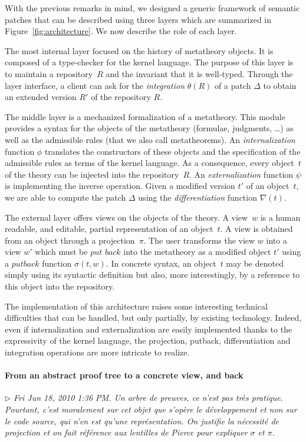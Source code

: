 \documentclass{article}
\newcommand{\remtext}[1]{\textcolor{bwgreen}{$\triangleright$ \textsl{#1}}}
\begin{document}
With the previous remarks in mind, we designed a generic framework of semantic
patches that can be described using three layers which are summarized in 
Figure~\ref{fig:architecture}. We now describe the role of each layer.

The most internal layer focused on the history of metatheory
objects. It is composed of a type-checker for the kernel language. The
purpose of this layer is to maintain a repository~$R$ and the
invariant that it is well-typed. Through the layer interface, a client
can ask for the \textit{integration} $\theta(R)$ of a patch $\Delta$
to obtain an extended version $R'$ of the repository $R$.

The middle layer is a mechanized formalization of a metatheory. This
module provides a syntax for the objects of the metatheory (formulae,
judgments, \ldots) as well as the admissible rules (that we also call
metatheorems).  An \textit{internalization} function $\phi$ translates
the constructors of these objects and the specification of the
admissible rules as terms of the kernel language. As a consequence,
every object~$t$ of the theory can be injected into the
repository~$R$. An \textit{externalization} function $\psi$ is
implementing the inverse operation. Given a modified version $t'$ of
an object~$t$, we are able to compute the patch $\Delta$ using
the \textit{differentiation} function $\nabla(t)$. 

The external layer offers views on the objects of the theory. A
view~$w$ is a human readable, and editable, partial representation of
an object~$t$. A view is obtained from an object through a
projection~$\pi$.  The user transforms the view $w$ into a view $w'$
which must be $\textit{put back}$ into the metatheory as a modified
object $t'$ using a $\textit{putback}$ function $\sigma(t, w)$.  In
concrete syntax, an object~$t$ may be denoted simply using its
syntactic definition but also, more interestingly, by a reference to this 
object into the repository.

The implementation of this architecture raises some interesting
technical difficulties that can be handled, but only partially, 
by existing technology. Indeed, even if internalization and 
externalization are easily implemented thanks to the expressivity
of the kernel language, the projection, putback, differentiation
and integration operations are more intricate to realize. 

\paragraph{From an abstract proof tree to a concrete view, and back}
\-
\remtext{Fri Jun 18, 2010  1:36 PM. Un arbre de preuves, ce n'est
  pas très pratique. Pourtant, c'est moralement sur cet objet 
  que s'opère le développement et non sur le code source, qui
  n'en est qu'une représentation. On justifie la nécessité de
  projection et on fait référence aux lentilles de Pierce pour
  expliquer $\sigma$ et $\pi$.}
\end{document}
